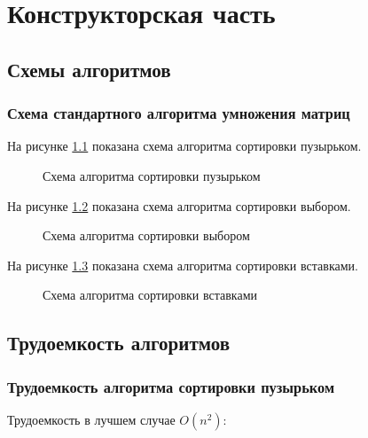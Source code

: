 
\chapter{Конструкторская часть}\label{Konstruct}

\section{Схемы алгоритмов}\label{SchemaAlg}


\subsection{Схема стандартного алгоритма умножения матриц}\label{SchemaMatrixMultiply}

На рисунке \ref{ris:schemabubble} показана схема алгоритма сортировки пузырьком.

\begin{figure}[H]
  \caption{Схема алгоритма сортировки пузырьком}
  \label{ris:schemabubble}
\end{figure}

На рисунке \ref{ris:schemachoise} показана схема алгоритма сортировки выбором.

\begin{figure}[H]
  \caption{Схема алгоритма сортировки выбором}
  \label{ris:schemachoise}
\end{figure}

На рисунке \ref{ris:schemainsert} показана схема алгоритма сортировки вставками.

\begin{figure}[H]
  \caption{Схема алгоритма сортировки вставками}
  \label{ris:schemainsert}
\end{figure}


\section{Трудоемкость алгоритмов}\label{Complecity}

\subsection{Трудоемкость алгоритма сортировки пузырьком}\label{ComplecityBubble}

Трудоемкость в лучшем случае $ O(n^2) $:

